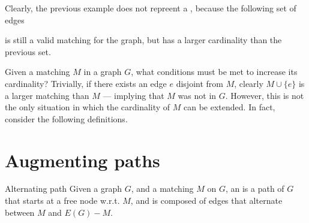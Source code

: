 \documentclass[a4paper, 12pt]{report}
\begin{document}
    Clearly, the previous example does not repreent a , because the following set of edges

     \begin{figure}[H]
        \centering
    \end{figure}

    is still a valid matching for the graph, but has a larger cardinality than the previous set.

    Given a matching $M$ in a graph $G$, what conditions must be met to increase its cardinality? Trivially, if there exists an edge $e$ disjoint from $M$, clearly $M \cup \{e\}$ is a larger matching than $M$ --- implying that $M$ was not  in $G$. However, this is not the only situation in which the cardinality of $M$ can be extended. In fact, consider the following definitions.

    \section{Augmenting paths}

    \begin{frameddefn}{Alternating path}
        Given a graph $G$, and a matching $M$ on $G$, an  is a path of $G$ that starts at a free node w.r.t. $M$, and is composed of edges that alternate between $M$ and $E(G) - M$.
    \end{frameddefn}
\end{document}
